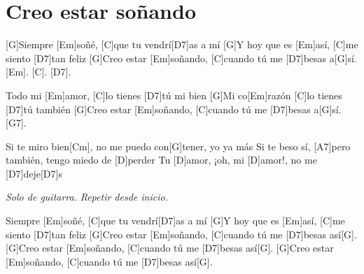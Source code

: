 \section{Creo estar soñando}
\label{sec:crea_estar_sonyando}

\noindent
\chordG
\chordEm
\chordC 
\chordDs

\noindent
\chordD 
\chordAs
\chordCm
\chordGs

\vspace{1cm}

\begin{guitar}

	[G]Siempre [Em]soñé, [C]que tu vendrí[D7]as a mí
	[G]Y hoy que es [Em]así, [C]me siento [D7]tan feliz
	[G]Creo estar [Em]soñando, [C]cuando tú me [D7]besas a[G]sí.
	\hspace{0.5cm} [Em]. \hspace{0.5cm} [C]. \hspace{0.5cm} [D7].

	\newline
	[G]Todo mi [Em]amor, [C]lo tienes [D7]tú mi bien
	[G]Mi co[Em]razón [C]lo tienes [D7]tú también
	[G]Creo estar [Em]soñando, [C]cuando tú me [D7]besas a[G]sí. [G7].

	\newline
	[C]Si te miro bien[Cm], no me puedo con[G]tener, yo ya más
	Si te beso sí, [A7]pero también, tengo miedo de [D]perder
	Tu [D]amor, ¡oh, mi [D]amor!, no me [D7]deje[D7]s

	\newline
	\textit{Solo de guitarra.}
	\textit{Repetir desde inicio.}

	\newline
	[G]Siempre [Em]soñé, [C]que tu vendrí[D7]as a mí
	[G]Y hoy que es [Em]así, [C]me siento [D7]tan feliz
	[G]Creo estar [Em]soñando, [C]cuando tú me [D7]besas así[G].
	[G]Creo estar [Em]soñando, [C]cuando tú me [D7]besas así[G].
	[G]Creo estar [Em]soñando, [C]cuando tú me [D7]besas así[G].

\end{guitar}

